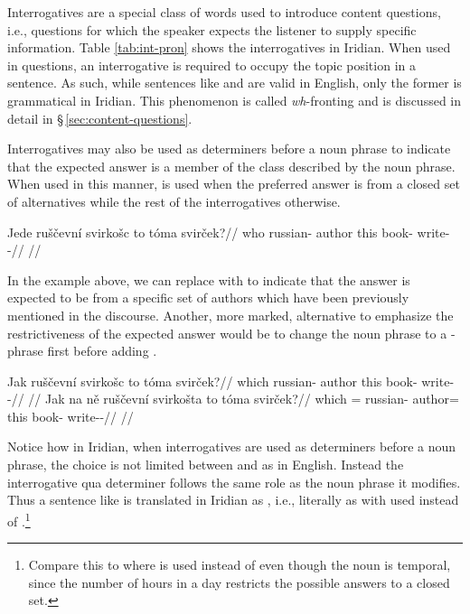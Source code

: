 Interrogatives are a special class of words used to introduce content questions,
i.e., questions for which the speaker expects the listener to supply specific
information. Table \ref{tab:int-pron} shows the interrogatives in Iridian. When
used in questions, an interrogative is required to occupy the topic position in
a sentence. As such, while sentences like  and  are valid in English, only the former is grammatical in Iridian.
This phenomenon is called \emph{wh}-fronting and is discussed in detail in
\S\,\ref{sec:content-questions}.

Interrogatives may also be used as determiners before a noun phrase to indicate
that the expected answer is a member of the class described by the noun phrase.
When used in this manner,  is used when the preferred answer is
from a closed set of alternatives while the rest of the interrogatives
otherwise.

\pex
\begingl
\gla Jede ruščevní svirkošc to tóma svirček?//
\glb who russian-\Att{} author this book-\Acc{} write-\Av{}-\Pf{}//
\glft {}//
\endgl
\xe

In the example above, we can replace  with  to
indicate that the answer is expected to be from a specific set of authors which
have been previously mentioned in the discourse. Another, more marked,
alternative to emphasize the restrictiveness of the expected answer would be to
change the noun phrase to a -phrase first before adding .

\pex
\a\begingl
\gla Jak ruščevní svirkošc to tóma svirček?//
\glb which russian-\Att{} author this book-\Acc{} write-\Av{}-\Pf{}//
\glft {}//
\endgl
\a\begingl
\gla Jak na ně ruščevní svirkošta to tóma svirček?//
\glb which \Loc{} \Pl{}= russian-\Att{} author=\Acc{} this book-\Acc{} write-\Av{}-\Pf{}//
\glft {}//
\endgl
\xe

Notice how in Iridian, when interrogatives are used as determiners before a noun
phrase, the choice is not limited between  and  as in
English. Instead the interrogative qua determiner follows the same role as the
noun phrase it modifies. Thus a sentence like 
is translated in Iridian as , i.e., literally as
 with  used instead of
.\footnote{Compare this to  where
 is used instead of  even though the noun  is
temporal, since the number of hours in a day restricts the possible answers to a
closed set.}

